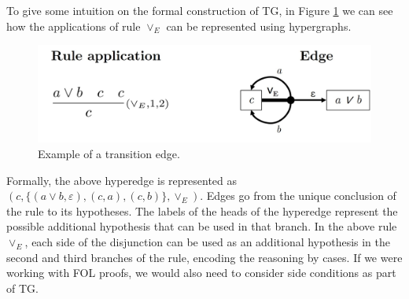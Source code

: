 To give some intuition on the formal construction of TG, in Figure \ref{fig:te-ex} we can see  how the applications of rule \(\vee_E\) can be represented using hypergraphs.



    \begin{figure}[h]
        \centering
        \includegraphics[width=0.8\linewidth]{resources/te-example.jpg}
        \caption{Example of a transition edge.}
        \label{fig:te-ex}
    \end{figure}

Formally, the above hyperedge is represented as $(c, \{(a \vee b, \varepsilon), (c, a), (c, b)\}, \vee_E)$. Edges go from the unique conclusion of the rule to its hypotheses. The labels of the heads of the hyperedge represent the possible additional hypothesis that can be used in that branch. In the above rule $\vee_E$, each side of the disjunction can be used as an additional hypothesis in the second and third branches of the rule, encoding the reasoning by cases. 
If we were working with FOL proofs, we would also need to consider side conditions as part of TG. 

